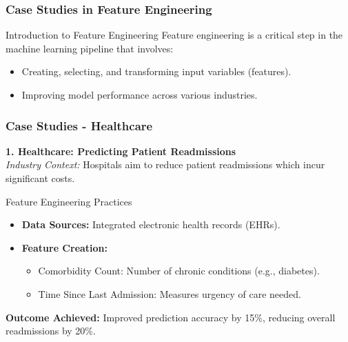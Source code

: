 \documentclass[aspectratio=169]{beamer}
\begin{document}
\begin{frame}[fragile]
    \frametitle{Case Studies in Feature Engineering}
    \begin{block}{Introduction to Feature Engineering}
        Feature engineering is a critical step in the machine learning pipeline that involves:
        \begin{itemize}
            \item Creating, selecting, and transforming input variables (features).
            \item Improving model performance across various industries.
        \end{itemize}
    \end{block}
\end{frame}

\begin{frame}[fragile]
    \frametitle{Case Studies - Healthcare}
    \textbf{1. Healthcare: Predicting Patient Readmissions} \\
    \textit{Industry Context:} 
    Hospitals aim to reduce patient readmissions which incur significant costs.
    
    \begin{block}{Feature Engineering Practices}
        \begin{itemize}
            \item \textbf{Data Sources:} Integrated electronic health records (EHRs).
            \item \textbf{Feature Creation:} 
            \begin{itemize}
                \item Comorbidity Count: Number of chronic conditions (e.g., diabetes).
                \item Time Since Last Admission: Measures urgency of care needed.
            \end{itemize}
        \end{itemize}
    \end{block}
    
    \textbf{Outcome Achieved:} 
    Improved prediction accuracy by 15\%, reducing overall readmissions by 20\%.
\end{frame}
\end{document}
